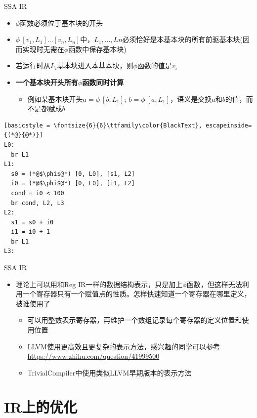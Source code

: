 \documentclass{beamer}
\begin{document}
\begin{frame}[fragile]{SSA IR}
\begin{itemize}
  \item $\phi$函数必须位于基本块的开头
  \item $\phi\ [v_1, L_1] \ldots [v_n, L_n]$中，$L_1, \ldots, Ln$必须恰好是本基本块的所有前驱基本块(因而实现时无需在$\phi$函数中保存基本块)
  \item 若运行时从$L_i$基本块进入本基本块，则$\phi$函数的值是$v_i$
  \item {\bf 一个基本块开头所有$\phi$函数同时计算}
  \begin{itemize}
    \item 例如某基本块开头$a = \phi\ [b, L_1];\ b = \phi\ [a, L_1]$，语义是交换$a$和$b$的值，而不是都赋成$b$
  \end{itemize}
\end{itemize}
\begin{center}
\begin{minipage}{0.36\textwidth}
\begin{lstlisting}[basicstyle = \fontsize{6}{6}\ttfamily\color{BlackText}, escapeinside={(*@}{@*)}]
L0: 
  br L1
L1:
  s0 = (*@$\phi$@*) [0, L0], [s1, L2]
  i0 = (*@$\phi$@*) [0, L0], [i1, L2]
  cond = i0 < 100
  br cond, L2, L3
L2:
  s1 = s0 + i0
  i1 = i0 + 1
  br L1
L3:
\end{lstlisting}
\end{minipage}
\end{center}
\end{frame}

\begin{frame}{SSA IR}
\begin{itemize}
  \item 理论上可以用和Reg IR一样的数据结构表示，只是加上$\phi$函数，但这样无法利用一个寄存器只有一个赋值点的性质。怎样快速知道一个寄存器在哪里定义，被谁使用了
  \begin{itemize}
    \item 可以用整数表示寄存器，再维护一个数组记录每个寄存器的定义位置和使用位置
    \item LLVM使用更高效且更复杂的表示方法，感兴趣的同学可以参考\href{https://www.zhihu.com/question/41999500}{https://www.zhihu.com/question/41999500}
    \item TrivialCompiler中使用类似LLVM早期版本的表示方法
  \end{itemize}
\end{itemize}
\end{frame}

\section{IR上的优化}
\end{document}
